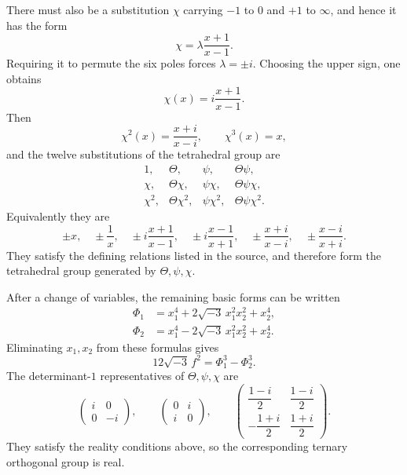 \documentclass[11pt]{article}
\begin{document}
There must also be a substitution $\chi$ carrying $-1$ to $0$ and $+1$ to $\infty$, and hence it has the form
\begin{equation}\label{eq:w9-chi}
 \chi=\lambda\frac{x+1}{x-1}.
\end{equation}
Requiring it to permute the six poles forces $\lambda=\pm i$.  Choosing the upper sign, one obtains
\[
 \chi(x)=i\frac{x+1}{x-1}.
\]
Then
\[
 \chi^2(x)=\frac{x+i}{x-i},
 \qquad \chi^3(x)=x,
\]
and the twelve substitutions of the tetrahedral group are
\begin{equation}\label{eq:w9-tet-list}
\begin{array}{cccc}
1,&\Theta,&\psi,&\Theta\psi,\\
\chi,&\Theta\chi,&\psi\chi,&\Theta\psi\chi,\\
\chi^2,&\Theta\chi^2,&\psi\chi^2,&\Theta\psi\chi^2.
\end{array}
\end{equation}
Equivalently they are
\begin{equation}\label{eq:w9-tet-explicit}
 \pm x,
 \quad \pm\frac1x,
 \quad \pm i\frac{x+1}{x-1},
 \quad \pm i\frac{x-1}{x+1},
 \quad \pm\frac{x+i}{x-i},
 \quad \pm\frac{x-i}{x+i}.
\end{equation}
They satisfy the defining relations listed in the source, and therefore form the tetrahedral group generated by $\Theta,\psi,\chi$.

After a change of variables, the remaining basic forms can be written
\begin{equation}\label{eq:w9-tet-Phi}
\begin{aligned}
 \Phi_1&=x_1^4+2\sqrt{-3}\,x_1^2x_2^2+x_2^4,\\
 \Phi_2&=x_1^4-2\sqrt{-3}\,x_1^2x_2^2+x_2^4.
\end{aligned}
\end{equation}
Eliminating $x_1,x_2$ from these formulas gives
\begin{equation}\label{eq:w9-tet-relation}
 12\sqrt{-3}\,f^2=\Phi_1^3-\Phi_2^3.
\end{equation}
The determinant-$1$ representatives of $\Theta,\psi,\chi$ are
\begin{equation}\label{eq:w9-tet-matrices}
\begin{pmatrix}i&0\\0&-i\end{pmatrix},
\qquad
\begin{pmatrix}0&i\\i&0\end{pmatrix},
\qquad
\begin{pmatrix}
\dfrac{1-i}{2}&\dfrac{1-i}{2}\\[4pt]
-\dfrac{1+i}{2}&\dfrac{1+i}{2}
\end{pmatrix}.
\end{equation}
They satisfy the reality conditions above, so the corresponding ternary orthogonal group is real.
\end{document}
